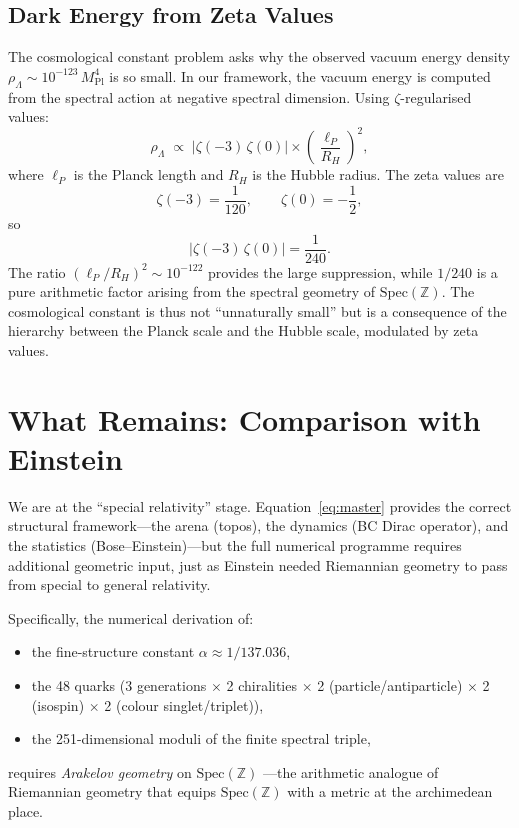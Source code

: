 \documentclass[11pt,a4paper]{article}
\begin{document}
\subsection{Dark Energy from Zeta Values}
\label{sec:darkenergy}

The cosmological constant problem asks why the observed vacuum energy density
$\rho_\Lambda \sim 10^{-123}\, M_{\mathrm{Pl}}^4$ is so small. In our
framework, the vacuum energy is computed from the spectral action at negative
spectral dimension. Using $\zeta$-regularised values:
\begin{equation}\label{eq:darkenergy}
  \rho_\Lambda \;\propto\;
  \bigl|\zeta(-3)\,\zeta(0)\bigr|
  \times \left(\frac{\ell_P}{R_H}\right)^{\!2},
\end{equation}
where $\ell_P$ is the Planck length and $R_H$ is the Hubble radius. The
zeta values are
\[
  \zeta(-3) = \frac{1}{120}, \qquad \zeta(0) = -\frac{1}{2},
\]
so
\[
  \bigl|\zeta(-3)\,\zeta(0)\bigr| = \frac{1}{240}.
\]
The ratio $(\ell_P / R_H)^2 \sim 10^{-122}$ provides the large suppression,
while $1/240$ is a pure arithmetic factor arising from the spectral geometry
of $\mathrm{Spec}(\mathbb{Z})$. The cosmological constant is thus not
``unnaturally small'' but is a consequence of the hierarchy between the
Planck scale and the Hubble scale, modulated by zeta values.

\section{What Remains: Comparison with Einstein}
\label{sec:comparison}

We are at the ``special relativity'' stage. Equation~\eqref{eq:master}
provides the correct structural framework---the arena (topos), the dynamics
(BC Dirac operator), and the statistics (Bose--Einstein)---but the full
numerical programme requires additional geometric input, just as Einstein
needed Riemannian geometry to pass from special to general relativity.

Specifically, the numerical derivation of:
\begin{itemize}
  \item the fine-structure constant $\alpha \approx 1/137.036$,
  \item the 48 quarks (3 generations $\times$ 2 chiralities $\times$
    2 (particle/antiparticle) $\times$ 2 (isospin) $\times$ 2 (colour
    singlet/triplet)),
  \item the 251-dimensional moduli of the finite spectral triple,
\end{itemize}
requires \emph{Arakelov geometry} on $\mathrm{Spec}(\mathbb{Z})$
\cite{Arakelov1974}---the arithmetic analogue of Riemannian geometry that
equips $\mathrm{Spec}(\mathbb{Z})$ with a metric at the archimedean place.
\end{document}
